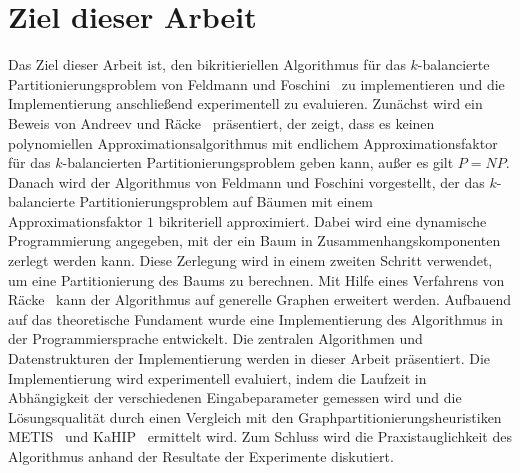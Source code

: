 \section{Ziel dieser Arbeit}
Das Ziel dieser Arbeit ist, den bikritieriellen Algorithmus für das $k$\hyp balancierte Partitionierungsproblem von Feldmann und Foschini~\cite{FF15} zu implementieren und die Implementierung anschließend experimentell zu evaluieren.
Zunächst wird ein Beweis von Andreev und Räcke~\cite{ar06} präsentiert, der zeigt, dass es keinen polynomiellen Approximationsalgorithmus mit endlichem Approximationsfaktor für das $k$\hyp balancierten Partitionierungsproblem geben kann, außer es gilt $P=NP$.
Danach wird der Algorithmus von Feldmann und Foschini vorgestellt, der das $k$\hyp balancierte Partitionierungsproblem auf Bäumen mit einem Approximationsfaktor $1$ bikriteriell approximiert. 
Dabei wird eine dynamische Programmierung angegeben, mit der ein Baum in Zusammenhangskomponenten zerlegt werden kann.
Diese Zerlegung wird in einem zweiten Schritt verwendet, um eine Partitionierung des Baums zu berechnen.
Mit Hilfe eines Verfahrens von Räcke~\cite{rc08} kann der Algorithmus auf generelle Graphen erweitert werden.
Aufbauend auf das theoretische Fundament wurde eine Implementierung des Algorithmus in der Programmiersprache \Cpp{} entwickelt.
Die zentralen Algorithmen und Datenstrukturen der Implementierung werden in dieser Arbeit präsentiert. 
Die Implementierung wird experimentell evaluiert, indem die Laufzeit in Abhängigkeit der verschiedenen Eingabeparameter gemessen wird und die Lösungsqualität durch einen Vergleich mit den Graphpartitionierungsheuristiken METIS~\cite{KK98} und KaHIP~\cite{SS13} ermittelt wird.
Zum Schluss wird die Praxistauglichkeit des Algorithmus anhand der Resultate der Experimente diskutiert.
